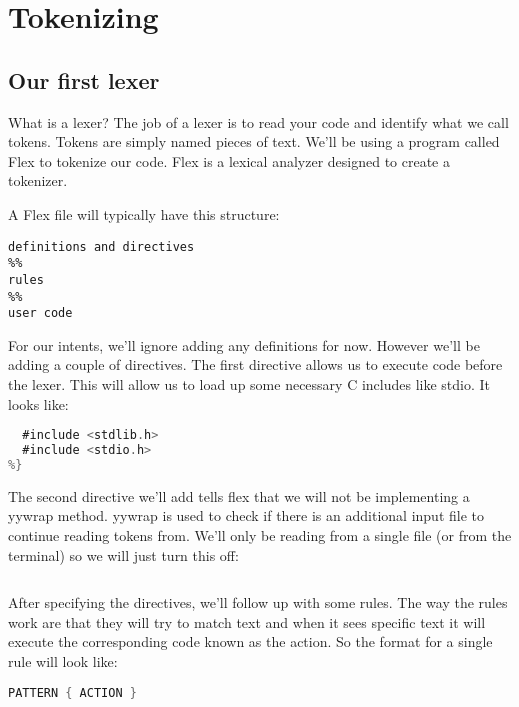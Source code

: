 \chapter{Tokenizing}

\section{Our first lexer}

What is a lexer? The job of a lexer is to read your code and identify what we call tokens. Tokens are simply named pieces of text. We'll be using a program called Flex to tokenize our code. Flex is a lexical analyzer designed to create a tokenizer.

A Flex file will typically have this structure:

\begin{lstlisting}
definitions and directives
%%
rules
%%
user code
\end{lstlisting}

For our intents, we'll ignore adding any definitions for now. However we'll be adding a couple of directives. The first directive allows us to execute code before the lexer. This will allow us to load up some necessary C includes like stdio. It looks like:

\begin{lstlisting}[language=C]
%{
  #include <stdlib.h>
  #include <stdio.h>
%}
\end{lstlisting}

The second directive we'll add tells flex that we will not be implementing a yywrap method. yywrap is used to check if there is an additional input file to continue reading tokens from. We'll only be reading from a single file (or from the terminal) so we will just turn this off:

\begin{lstlisting}[language=C]
%option noyywrap
\end{lstlisting}

After specifying the directives, we'll follow up with some rules. The way the rules work are that they will try to match text and when it sees specific text it will execute the corresponding code known as the action. So the format for a single rule will look like:

\begin{lstlisting}[language=C]
PATTERN { ACTION }
\end{lstlisting}

